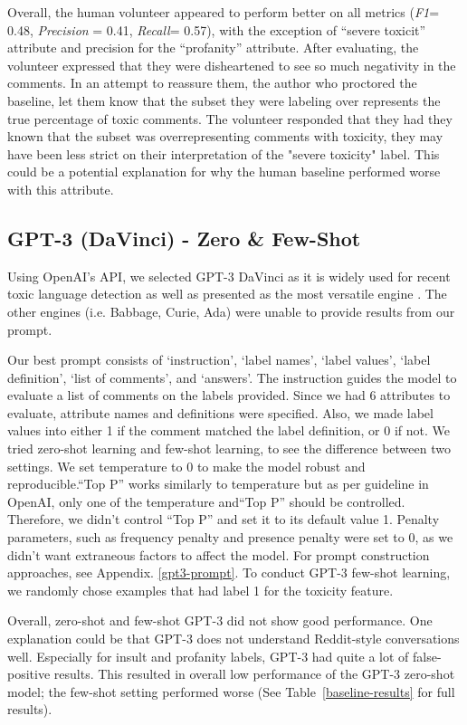 \documentclass[11pt]{article}
\begin{document}
Overall, the human volunteer appeared to perform better on all metrics (\emph{F1}= 0.48, \emph{Precision} =  0.41, \emph{Recall}= 0.57), with the exception of ``severe toxicit'' attribute and precision for the ``profanity'' attribute. After evaluating, the volunteer expressed that they were disheartened to see so much negativity in the comments. In an attempt to reassure them, the author who proctored the baseline, let them know that the subset they were labeling over represents the true percentage of toxic comments. The volunteer responded that they had they known that the subset was overrepresenting comments with toxicity, they may have been less strict on their interpretation of the "severe toxicity" label. This could be a potential explanation for why the human baseline performed worse with this attribute.

\subsection{ GPT-3 (DaVinci) - Zero \& Few-Shot}
Using OpenAI’s API, we selected GPT-3 DaVinci as it is widely used for recent toxic language detection as well as presented as the most versatile engine \citep{gehman2020, zhou2021, baheti2021}. The other engines (i.e. Babbage, Curie, Ada) were unable to provide results from our prompt. 

Our best prompt consists of ‘instruction’, ‘label names’, ‘label values’, ‘label definition’, ‘list of comments’, and ‘answers’. The instruction guides the model to evaluate a list of comments on the labels provided. Since we had 6 attributes to evaluate, attribute names and definitions were specified. Also, we made label values into either 1 if the comment matched the label definition, or 0 if not. We tried zero-shot learning and few-shot learning, to see the difference between two settings. We set temperature to 0 to make the model robust and reproducible.``Top P'' works similarly to temperature but as per guideline in OpenAI, only one of the temperature and``Top P'' should be controlled. Therefore, we didn’t control ``Top P'' and set it to its default value 1. Penalty parameters, such as frequency penalty and presence penalty were set to 0, as we didn’t want extraneous factors to affect the model. For prompt construction approaches, see Appendix. \ref{gpt3-prompt}. To conduct GPT-3 few-shot learning, we randomly chose examples that had label 1 for the toxicity feature.  

Overall, zero-shot and few-shot GPT-3 did not show good performance. One explanation could be that GPT-3 does not understand Reddit-style conversations well. Especially for insult and profanity labels, GPT-3 had quite a lot of false-positive results. This resulted in overall low performance of the GPT-3 zero-shot model; the few-shot setting performed worse (See Table~\ref{baseline-results} for full results). 
\end{document}
